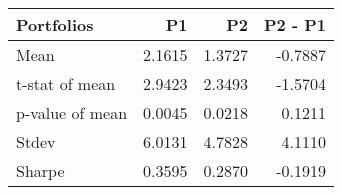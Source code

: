 \begin{tabular}{lrrr}
\toprule
Portfolios & P1 & P2 & P2 - P1 \\
\midrule
Mean & 2.1615 & 1.3727 & -0.7887 \\
t-stat of mean & 2.9423 & 2.3493 & -1.5704 \\
p-value of mean & 0.0045 & 0.0218 & 0.1211 \\
Stdev & 6.0131 & 4.7828 & 4.1110 \\
Sharpe & 0.3595 & 0.2870 & -0.1919 \\
\bottomrule
\end{tabular}
